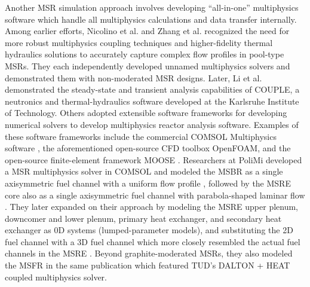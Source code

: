 Another \gls{MSR} simulation approach involves developing ``all-in-one''
multiphysics software which handle all multiphysics calculations and data
transfer internally. Among earlier efforts, Nicolino et al.
\cite{nicolino_coupled_2008} and Zhang et al. \cite{zhang_development_2009}
recognized the
need for more robust multiphysics coupling techniques and higher-fidelity
thermal hydraulics solutions to accurately capture complex flow profiles in
pool-type \glspl{MSR}. They each independently developed unnamed multiphysics
solvers and demonstrated them with non-moderated \gls{MSR}
designs. Later, Li et al. \cite{li_transient_2015} demonstrated the
steady-state and transient analysis capabilities of COUPLE, a neutronics and
thermal-hydraulics software developed at the Karlsruhe Institute of Technology.
Others adopted extensible software frameworks for developing numerical solvers
to develop multiphysics reactor analysis software. Examples of these software
frameworks include the commercial COMSOL
Multiphysics\textsuperscript{\textregistered} software
\cite{comsol_ab_comsol_nodate}, the aforementioned open-source CFD toolbox
OpenFOAM, and the open-source finite-element
framework \gls{MOOSE} \cite{gaston_physics-based_2015}. Researchers at
\gls{PoliMi} developed a \gls{MSR} multiphysics solver in COMSOL and
modeled the \gls{MSBR} as a single axisymmetric fuel channel with a uniform
flow profile \cite{cammi_multi-physics_2011}, followed by the \gls{MSRE} core
also as a single axisymmetric fuel channel with parabola-shaped laminar flow
\cite{cammi_dimensional_2012}. They later expanded on their approach by
modeling the \gls{MSRE} upper plenum, downcomer and lower plenum, primary heat
exchanger, and secondary heat exchanger as 0D systems (lumped-parameter
models), and substituting the 2D fuel channel with a 3D fuel channel which more
closely resembled the actual fuel channels in the \gls{MSRE}
\cite{zanetti_geometric_2015}. Beyond graphite-moderated \glspl{MSR}, they
also modeled the \gls{MSFR} in the same publication which featured \gls{TUD}'s
DALTON + HEAT coupled multiphysics solver.

